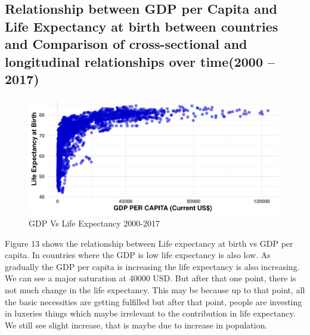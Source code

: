 \documentclass[
]{article}
\begin{document}
\hypertarget{relationship-between-gdp-per-capita-and-life-expectancy-at-birth-between-countries-and-comparison-of-cross-sectional-and-longitudinal-relationships-over-time2000-2017}{%
\subsection{Relationship between GDP per Capita and Life Expectancy at
birth between countries and Comparison of cross-sectional and
longitudinal relationships over time(2000
--2017)}\label{relationship-between-gdp-per-capita-and-life-expectancy-at-birth-between-countries-and-comparison-of-cross-sectional-and-longitudinal-relationships-over-time2000-2017}}

\begin{figure}
\centering
\includegraphics{Report_files/figure-latex/plot13-1.pdf}
\caption{GDP Vs Life Expectancy 2000-2017}
\end{figure}

Figure 13 shows the relationship between Life expectancy at birth vs GDP
per capita. In countries where the GDP is low life expectancy is also
low. As gradually the GDP per capita is increasing the life expectancy
is also increasing. We can see a major saturation at 40000 USD. But
after that one point, there is not much change in the life expectancy.
This may be because up to that point, all the basic necessities are
getting fulfilled but after that point, people are investing in luxeries
things which maybe irrelevant to the contribution in life expectancy. We
still see slight increase, that is maybe due to increase in population.
\end{document}
